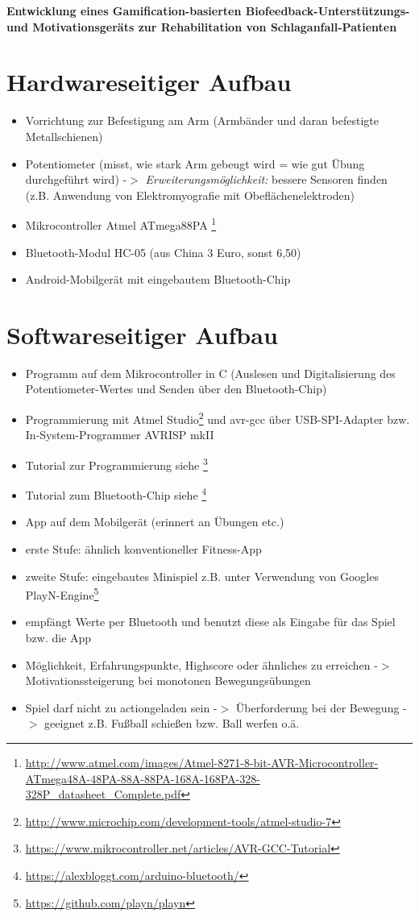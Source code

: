 \documentclass[a4paper, 11pt, titlepage, bibliography=totocnumbered,landscape]{scrartcl}
\begin{document}
\centering \textbf{\Large{Entwicklung eines Gamification-basierten Biofeedback-Unterstützungs- und Motivationsgeräts zur Rehabilitation von Schlaganfall-Patienten}}
\\
\begin{multicols*}{2}
\section{Hardwareseitiger Aufbau}
\begin{itemize}
\item Vorrichtung zur Befestigung am Arm (Armbänder und daran befestigte Metallschienen)
\item Potentiometer (misst, wie stark Arm gebeugt wird = wie gut Übung durchgeführt wird) -$>$ \textit{Erweiterungsmöglichkeit:} bessere Sensoren finden (z.B. Anwendung von Elektromyografie mit Obeflächenelektroden)
\item Mikrocontroller Atmel ATmega88PA \footnote{\url{http://www.atmel.com/images/Atmel-8271-8-bit-AVR-Microcontroller-ATmega48A-48PA-88A-88PA-168A-168PA-328-328P_datasheet_Complete.pdf}}
\item Bluetooth-Modul HC-05 (aus China 3 Euro, sonst 6,50)
\item Android-Mobilgerät mit eingebautem Bluetooth-Chip
\end{itemize}
\section{Softwareseitiger Aufbau}
\begin{itemize}
\item Programm auf dem Mikrocontroller in C (Auslesen und Digitalisierung des Potentiometer-Wertes und Senden über den Bluetooth-Chip)
\item Programmierung mit Atmel Studio\footnote{\url{http://www.microchip.com/development-tools/atmel-studio-7}} und avr-gcc über USB-SPI-Adapter bzw. In-System-Programmer AVRISP mkII
\item Tutorial zur Programmierung siehe \footnote{\url{https://www.mikrocontroller.net/articles/AVR-GCC-Tutorial}}
\item Tutorial zum Bluetooth-Chip siehe \footnote{\url{https://alexbloggt.com/arduino-bluetooth/}}
\item App auf dem Mobilgerät (erinnert an Übungen etc.)
\item erste Stufe: ähnlich konventioneller Fitness-App
\item zweite Stufe: eingebautes Minispiel z.B. unter Verwendung von Googles PlayN-Engine\footnote{\url{https://github.com/playn/playn}}
\item empfängt Werte per Bluetooth und benutzt diese als Eingabe für das Spiel bzw. die App
\item Möglichkeit, Erfahrungspunkte, Highscore oder ähnliches zu erreichen -$>$ Motivationssteigerung bei monotonen Bewegungsübungen
\item Spiel darf nicht zu actiongeladen sein -$>$ Überforderung bei der Bewegung -$>$ geeignet z.B. Fußball schießen bzw. Ball werfen o.ä.
\end{itemize}

\end{multicols*}
\end{document}

